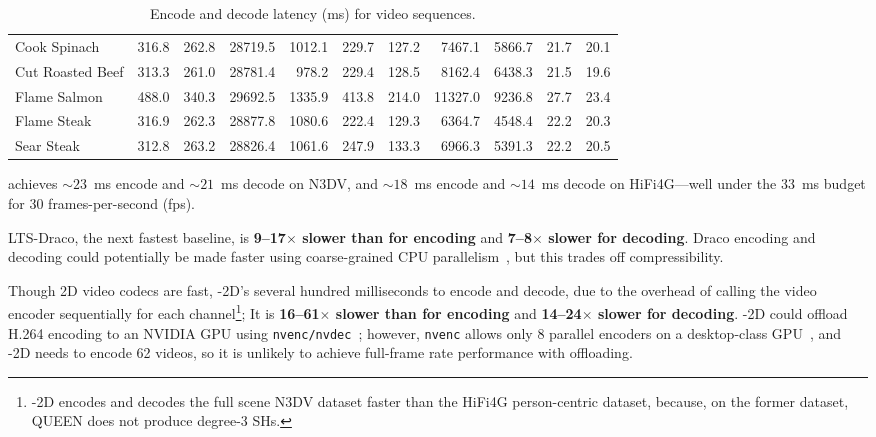 \begin{table}[t]
{\begin{tabular}{l|rr|rr|rr|rr|rr}
    Cook Spinach     & 316.8 & 262.8 & 28719.5 & 1012.1 & 229.7  & 127.2 & 7467.1  & 5866.7  & 21.7 & 20.1 \\
    Cut Roasted Beef & 313.3 & 261.0 & 28781.4 & 978.2  & 229.4  & 128.5 & 8162.4  & 6438.3  & 21.5 & 19.6 \\
    Flame Salmon     & 488.0 & 340.3 & 29692.5 & 1335.9 & 413.8  & 214.0 & 11327.0 & 9236.8  & 27.7 & 23.4 \\
    Flame Steak      & 316.9 & 262.3 & 28877.8 & 1080.6 & 222.4  & 129.3 & 6364.7  & 4548.4  & 22.2 & 20.3 \\
    Sear Steak       & 312.8 & 263.2 & 28826.4 & 1061.6 & 247.9  & 133.3 & 6966.3  & 5391.3  & 22.2 & 20.5 \\
    \bottomrule
    \end{tabular}
  }
  \caption{Encode and decode latency (ms) for video sequences.}
  \label{tab:latency_per_sequence}
\end{table}

\gsnfs{} achieves ${\sim}23$~ms encode and ${\sim}21$~ms decode on N3DV, and ${\sim}18$~ms encode and ${\sim}14$~ms decode on HiFi4G---well under the 33~ms budget for 30 frames-per-second (fps).

LTS-Draco, the next fastest baseline, is \textbf{9--17$\boldsymbol\times$ slower than \gsnfs{} for encoding} and \textbf{7--8$\boldsymbol\times$ slower for decoding}.
%
Draco encoding and decoding could potentially be made faster using coarse-grained CPU parallelism~\cite{meshreduce,vivo,metastream}, but this trades off compressibility.

Though 2D video codecs are fast, \vthree{}-2D's several hundred milliseconds to encode and decode, due to the overhead of calling the video encoder sequentially for each channel\footnote{\vthree{}-2D encodes and decodes the full scene N3DV dataset faster than the HiFi4G person-centric dataset, because, on the former dataset, QUEEN does not produce degree-3 SHs.};
It is \textbf{16--61$\boldsymbol\times$ slower than \gsnfs{} for encoding} and \textbf{14--24$\boldsymbol\times$ slower for decoding}.
%
\vthree{}-2D could offload H.264 encoding to an NVIDIA GPU using \texttt{nvenc/nvdec}~\cite{nvenc-sdk}; however, \texttt{nvenc} allows only 8 parallel encoders on a desktop-class GPU~\cite{nvenc-limit}, and \vthree{}-2D needs to encode 62 videos, so it is unlikely to achieve full-frame rate performance with offloading.

